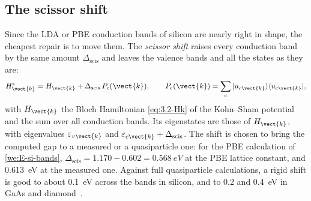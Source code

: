 \subsection{The scissor shift}

Since the LDA or PBE conduction bands of silicon are nearly right in shape, the cheapest repair is to move them. The \emph{scissor shift} raises every conduction band by the same amount $\Delta_{\mathrm{scis}}$ and leaves the valence bands and all the states as they are:
\begin{equation}
  H^{\mathrm{s}}_{\vect{k}} = H_{\vect{k}} + \Delta_{\mathrm{scis}}\,P_{\mathrm{c}}(\vect{k}), \qquad
  P_{\mathrm{c}}(\vect{k}) = \sum_c|u_{c\vect{k}}\rangle\langle u_{c\vect{k}}| ,
  \label{eq:3.4-scissor}
\end{equation}
with $H_{\vect{k}}$ the Bloch Hamiltonian \cref{eq:3.2-Hk} of the Kohn--Sham potential and the sum over all conduction bands. Its eigenstates are those of $H_{\vect{k}}$, with eigenvalues $\varepsilon_{v\vect{k}}$ and $\varepsilon_{c\vect{k}} + \Delta_{\mathrm{scis}}$. The shift is chosen to bring the computed gap to a measured or a quasiparticle one: for the PBE calculation of \cref{we:E-si-bands}, $\Delta_{\mathrm{scis}} = 1.170 - 0.602 = \SI{0.568}{eV}$ at the PBE lattice constant, and \SI{0.613}{eV} at the measured one. Against full quasiparticle calculations, a rigid shift is good to about \SI{0.1}{eV} across the bands in silicon, and to 0.2 and \SI{0.4}{eV} in GaAs and diamond~\cite{godby1988self}\cite[Sect.~V\,B]{aryasetiawan1998gw}.

